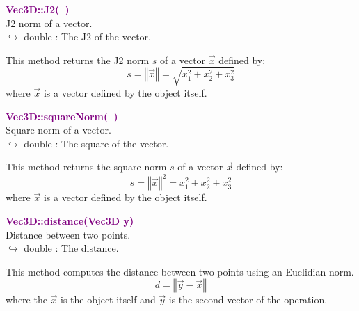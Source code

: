 \textcolor{purple}{\textbf{Vec3D::J2(~)}}\label{Vec3D::J2()}\\
J2 norm of a vector.\\ \hspace*{10mm}$\hookrightarrow$ double : The J2 of the vector.

This method returns the J2 norm $s$ of a vector $\overrightarrow{x}$ defined by:
\begin{equation*}
s = \left\Vert \overrightarrow{x} \right\Vert  = \sqrt {x_{1}^2 + x_{2}^2 + x_{3}^2}
\end{equation*}
where $\overrightarrow{x}$ is a vector defined by the object itself.

\textcolor{purple}{\textbf{Vec3D::squareNorm(~)}}\label{Vec3D::squareNorm()}\\
Square norm of a vector.\\ \hspace*{10mm}$\hookrightarrow$ double : The square of the vector.

This method returns the square norm $s$ of a vector $\overrightarrow{x}$ defined by:
\begin{equation*}
s = \left\Vert \overrightarrow{x} \right\Vert^2  = {x_{1}^2 + x_{2}^2 + x_{3}^2}
\end{equation*}
where $\overrightarrow{x}$ is a vector defined by the object itself.

\textcolor{purple}{\textbf{Vec3D::distance(Vec3D y)}}\label{Vec3D::distance(Vec3D y)}\\
Distance between two points.\\ \hspace*{10mm}$\hookrightarrow$ double : The distance.

This method computes the distance between two points using an Euclidian norm.
\begin{equation*}
d = \left\Vert \overrightarrow{y} - \overrightarrow{x} \right\Vert
\end{equation*}
where the $\overrightarrow{x}$ is the object itself and $\overrightarrow{y}$ is the second vector of the operation.

